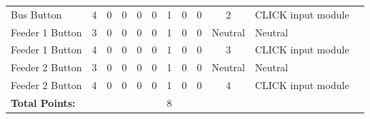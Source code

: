 \begin{table}[!htp]
{\begin{tabular}{lcccccccccll}
			Bus Button                 & 4                       & 0                                           & 0                                          & 0           & 0           & 1            & 0                & 0 & 2                            & CLICK input module               &                \\
			Feeder 1 Button            & 3                       & 0                                           & 0                                          & 0           & 0           & 1            & 0                & 0 & Neutral                      & Neutral                          &                \\
			Feeder 1 Button            & 4                       & 0                                           & 0                                          & 0           & 0           & 1            & 0                & 0 & 3                            & CLICK input module               &                \\
			Feeder 2 Button            & 3                       & 0                                           & 0                                          & 0           & 0           & 1            & 0                & 0 & Neutral                      & Neutral                          &                \\
			Feeder 2 Button            & 4                       & 0                                           & 0                                          & 0           & 0           & 1            & 0                & 0 & 4                            & CLICK input module               &                \\ \midrule
			\textbf{Total Points:}     &                         &                                             &                                            &             &             & 8            &                  &   &                              &                                  &                \\ \bottomrule
		\end{tabular}
	}
\end{table}
